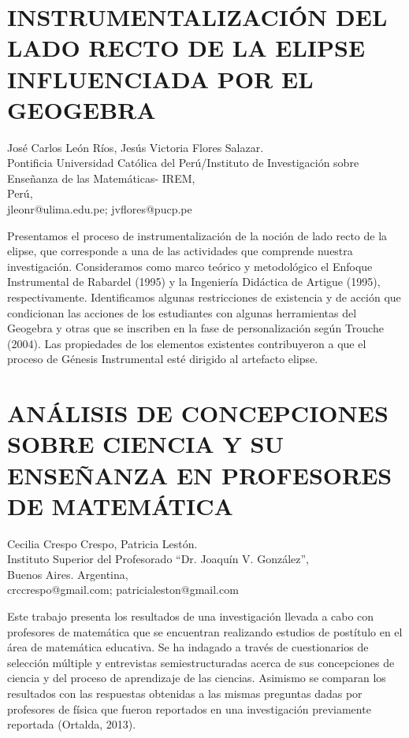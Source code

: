 \section{INSTRUMENTALIZACIÓN DEL LADO RECTO DE LA ELIPSE INFLUENCIADA POR
EL GEOGEBRA }

\begin{datos}
José Carlos León Ríos, Jesús Victoria Flores Salazar. \\
Pontificia Universidad Católica del Perú/Instituto de Investigación sobre Enseñanza de las Matemáticas- IREM,\\
\hfill Perú, \\
\hfill jleonr@ulima.edu.pe; jvflores@pucp.pe
\end{datos}

Presentamos el proceso de instrumentalización de la noción de lado
recto de la elipse, que corresponde a una de las actividades que comprende
nuestra investigación. Consideramos como marco teórico y metodológico
el Enfoque Instrumental de Rabardel (1995) y la Ingeniería Didáctica
de Artigue (1995), respectivamente. Identificamos algunas restricciones
de existencia y de acción que condicionan las acciones de los estudiantes
con algunas herramientas del Geogebra y otras que se inscriben en
la fase de personalización según Trouche (2004). Las propiedades de
los elementos existentes contribuyeron a que el proceso de Génesis
Instrumental esté dirigido al artefacto elipse.


\section{ANÁLISIS DE CONCEPCIONES SOBRE CIENCIA Y SU ENSEÑANZA EN PROFESORES
DE MATEMÁTICA }

\begin{datos}
Cecilia Crespo Crespo, Patricia Lestón. \\
Instituto Superior del Profesorado “Dr. Joaquín V. González”,\\
\hfill Buenos Aires. Argentina, \\
\hfill crccrespo@gmail.com; patricialeston@gmail.com
\end{datos}

Este trabajo presenta los resultados de una investigación llevada
a cabo con profesores de matemática que se encuentran realizando estudios
de postítulo en el área de matemática educativa. Se ha indagado a
través de cuestionarios de selección múltiple y entrevistas semiestructuradas
acerca de sus concepciones de ciencia y del proceso de aprendizaje
de las ciencias. Asimismo se comparan los resultados con las respuestas
obtenidas a las mismas preguntas dadas por profesores de física que
fueron reportados en una investigación previamente reportada (Ortalda,
2013).


